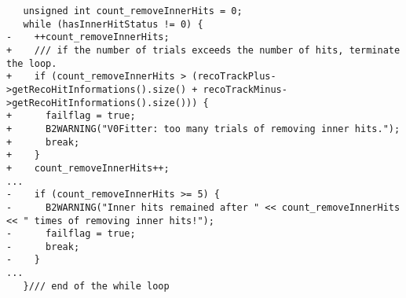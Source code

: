 \begin{verbatim}
   unsigned int count_removeInnerHits = 0;
   while (hasInnerHitStatus != 0) {
-    ++count_removeInnerHits;
+    /// if the number of trials exceeds the number of hits, terminate the loop.
+    if (count_removeInnerHits > (recoTrackPlus->getRecoHitInformations().size() + recoTrackMinus->getRecoHitInformations().size())) {
+      failflag = true;
+      B2WARNING("V0Fitter: too many trials of removing inner hits.");
+      break;
+    }
+    count_removeInnerHits++;
...
-    if (count_removeInnerHits >= 5) {
-      B2WARNING("Inner hits remained after " << count_removeInnerHits << " times of removing inner hits!");
-      failflag = true;
-      break;
-    }
...
   }/// end of the while loop
\end{verbatim}